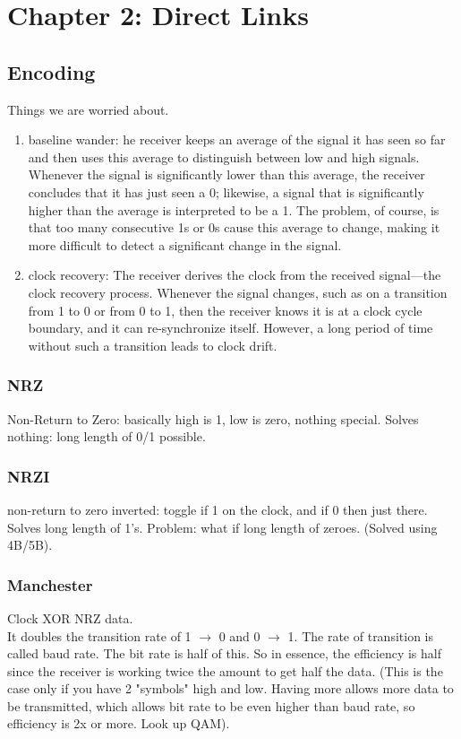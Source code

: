 \documentclass[11pt, a4paper]{article}
\begin{document}
\section{Chapter 2: Direct Links}

\subsection{Encoding}

Things we are worried about.
\begin{enumerate}
    \item baseline wander: he receiver keeps an average of the signal it has seen so far and then uses this average to distinguish between low and high signals. Whenever the signal is significantly lower than this average, the receiver concludes that it has just seen a 0; likewise, a signal that is significantly higher than the average is interpreted to be a 1. The problem, of course, is that too many consecutive 1s or 0s cause this average to change, making it more difficult to detect a significant change in the signal.
    \item clock recovery: The receiver derives the clock from the received signal—the clock recovery process. Whenever the signal changes, such as on a transition from 1 to 0 or from 0 to 1, then the receiver knows it is at a clock cycle boundary, and it can re-synchronize itself. However, a long period of time without such a transition leads to clock drift.
\end{enumerate}

\subsubsection{NRZ}
Non-Return to Zero: basically high is 1, low is zero, nothing special. Solves nothing: long length of 0/1 possible.

\subsubsection{NRZI}
non-return to zero inverted: toggle if 1 on the clock, and if 0 then just there. Solves long length of 1's. Problem: what if long length of zeroes. (Solved using 4B/5B).

\subsubsection{Manchester}
Clock XOR NRZ data.\\
It doubles the transition rate of 1 $\to$ 0 and 0 $\to$ 1. The rate of transition is called baud rate. The bit rate is half of this. So in essence, the efficiency is half since the receiver is working twice the amount to get half the data. (This is the case only if you have 2 "symbols" high and low. Having more allows more data to be transmitted, which allows bit rate to be even higher than baud rate, so efficiency is 2x or more. Look up QAM).
\end{document}
